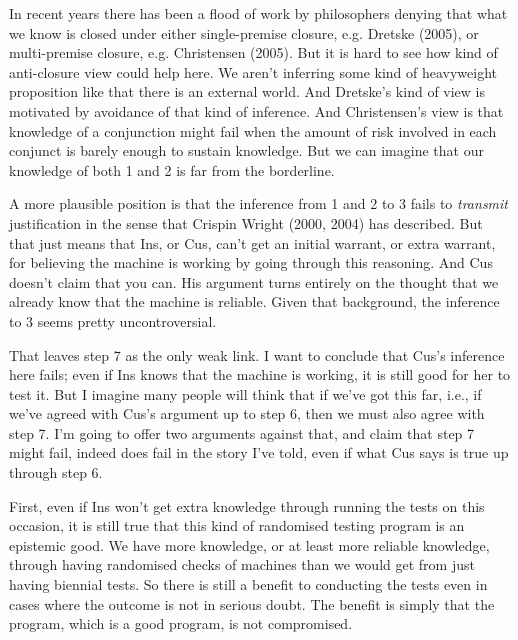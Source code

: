 In recent years there has been a flood of work by philosophers denying that what we know is closed under either single-premise closure, e.g. Dretske (2005), or multi-premise closure, e.g. Christensen (2005). But it is hard to see how kind of anti-closure view could help here. We aren't inferring some kind of heavyweight proposition like that there is an external world. And Dretske's kind of view is motivated by avoidance of that kind of inference. And Christensen's view is that knowledge of a conjunction might fail when the amount of risk involved in each conjunct is barely enough to sustain knowledge. But we can imagine that our knowledge of both 1 and 2 is far from the borderline.

A more plausible position is that the inference from 1 and 2 to 3 fails to \textit{transmit} justification in the sense that Crispin Wright (2000, 2004) has described. But that just means that Ins, or Cus, can't get an initial warrant, or extra warrant, for believing the machine is working by going through this reasoning. And Cus doesn't claim that you can. His argument turns entirely on the thought that we already know that the machine is reliable. Given that background, the inference to 3 seems pretty uncontroversial.

That leaves step 7 as the only weak link. I want to conclude that Cus's inference here fails; even if Ins knows that the machine is working, it is still good for her to test it. But I imagine many people will think that if we've got this far, i.e., if we've agreed with Cus's argument up to step 6, then we must also agree with step 7. I'm going to offer two arguments against that, and claim that step 7 might fail, indeed does fail in the story I've told, even if what Cus says is true up through step 6.

First, even if Ins won't get extra knowledge through running the tests on this occasion, it is still true that this kind of randomised testing program is an epistemic good. We have more knowledge, or at least more reliable knowledge, through having randomised checks of machines than we would get from just having biennial tests. So there is still a benefit to conducting the tests even in cases where the outcome is not in serious doubt. The benefit is simply that the program, which is a good program, is not compromised.

